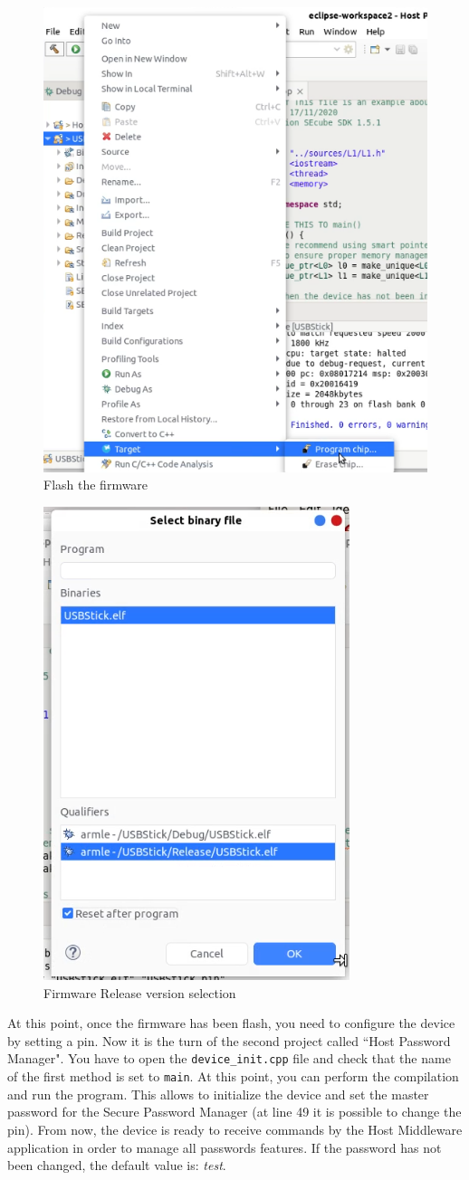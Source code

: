 \begin{figure}[H]
	\centering
	\includegraphics[width=0.55\linewidth]{images/firmware/setup_11}
	\caption{Flash the firmware}
	\label{fig:setup11}
\end{figure}


\begin{figure}[H]
	\centering
	\includegraphics[width=0.3\linewidth]{images/firmware/setup_12}
	\caption{Firmware Release version selection}
	\label{fig:setup12}
\end{figure}

At this point, once the firmware has been flash, you need to configure the device by setting a pin. Now it is the turn of the second project called ``Host Password Manager".\newline\newline
You have to open the \texttt{device\_init.cpp} file and check that the name of the first method is set to \texttt{main}. At this point, you can perform the compilation and run the program. This allows to initialize the device and set the master password for the Secure Password Manager (at line 49 it is possible to change the pin). From now, the device is ready to receive commands by the Host Middleware application in order to manage all passwords features. If the password has not been changed, the default value is: \textit{test}.

